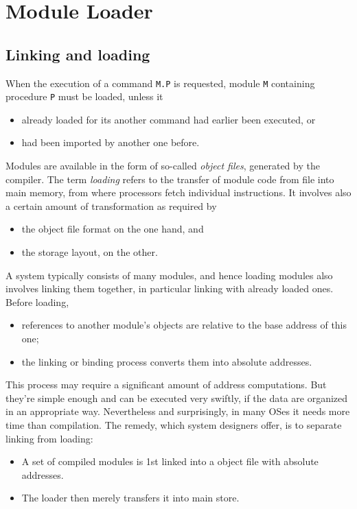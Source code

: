 \chapter{Module Loader}
\label{ch:ML}
\section{Linking and loading}
When the execution of a command \verb|M.P| is requested,
module \verb|M| containing procedure \verb|P| must be loaded, unless it
\begin{itemize}
  \item already loaded for its another command had earlier been executed, or
  \item had been imported by another one before.
\end{itemize}
Modules are available in the form of so-called \emph{object files}, generated by the compiler.
The term \emph{loading} refers to the transfer of module code from file into main memory,
from where processors fetch individual instructions.
It involves also a certain amount of transformation as required by
\begin{itemize}
  \item the object file format on the one hand, and
  \item the storage layout, on the other.
\end{itemize}
A system typically consists of many modules,
and hence loading modules also involves linking them together,
in particular linking with already loaded ones.  Before loading,
\begin{itemize}
  \item references to another module's objects are relative to the base address of this one;
  \item the linking or binding process converts them into absolute addresses.
\end{itemize}
This process may require a significant amount of address computations.
But they're simple enough and can be executed very swiftly,
if the data are organized in an appropriate way.  Nevertheless and surprisingly, in many OSes
it needs more time than compilation.  The remedy, which system designers offer,
is to separate linking from loading:
\begin{itemize}
  \item A set of compiled modules is 1st linked into a object file with absolute addresses.
  \item The loader then merely transfers it into main store.
\end{itemize}

